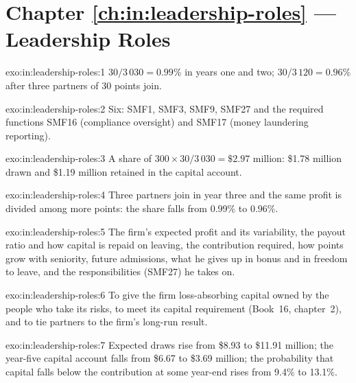 \section*{Chapter \ref{ch:in:leadership-roles} --- Leadership Roles}

\begin{solution}{exo:in:leadership-roles:1}
$30/3\,030=0.99\%$ in years one and two; $30/3\,120=0.96\%$ after three partners of 30 points join.
\end{solution}

\begin{solution}{exo:in:leadership-roles:2}
Six: SMF1, SMF3, SMF9, SMF27 and the required functions SMF16 (compliance oversight) and SMF17 (money laundering
reporting).
\end{solution}

\begin{solution}{exo:in:leadership-roles:3}
A share of $300\times30/3\,030=\$2.97$ million: \$1.78 million drawn and \$1.19 million retained in the capital account.
\end{solution}

\begin{solution}{exo:in:leadership-roles:4}
Three partners join in year three and the same profit is divided among more points: the share falls from 0.99\% to
0.96\%.
\end{solution}

\begin{solution}{exo:in:leadership-roles:5}
The firm's expected profit and its variability, the payout ratio and how capital is repaid on leaving, the contribution
required, how points grow with seniority, future admissions, what he gives up in bonus and in freedom to leave, and the
responsibilities (SMF27) he takes on.
\end{solution}

\begin{solution}{exo:in:leadership-roles:6}
To give the firm loss-absorbing capital owned by the people who take its risks, to meet its capital requirement
(Book~16, chapter~2), and to tie partners to the firm's long-run result.
\end{solution}

\begin{solution}{exo:in:leadership-roles:7}
Expected draws rise from \$8.93 to \$11.91 million; the year-five capital account falls from \$6.67 to \$3.69 million;
the probability that capital falls below the contribution at some year-end rises from 9.4\% to 13.1\%.
\end{solution}

